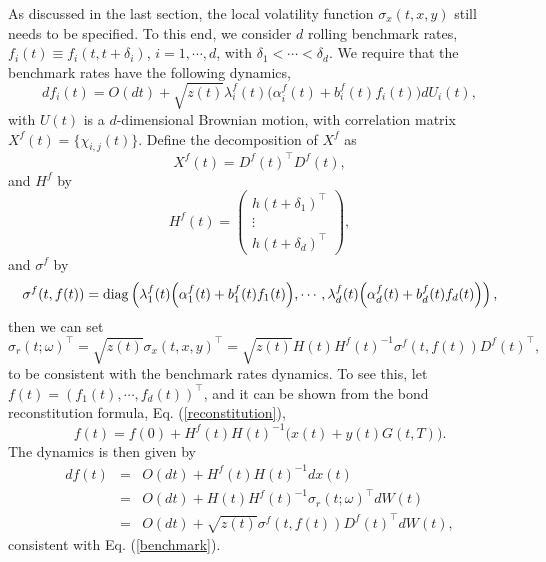 \documentclass[12pt]{article}
\begin{document}
    As discussed in the last section, the local volatility function $\sigma_x(t,x,y)$ still needs to be specified.
    To this end, we consider $d$ rolling benchmark rates, $f_i(t)\equiv f_i(t,t+\delta_i)$, $i=1,\cdots,d$, with
    $\delta_1<\cdots<\delta_d$. We require that the benchmark rates have the following dynamics,
    \begin{equation}
      df_i(t)=O(dt)+\sqrt{z(t)}\lambda_i^f(t)\Big(\alpha_i^f(t)+b_i^f(t)f_i(t)\Big)dU_i(t),
      \label{benchmark}
    \end{equation}
    with $U(t)$ is a $d$-dimensional Brownian motion, with correlation matrix $X^f(t)=\{\chi_{i,j}(t)\}$. Define the decomposition
    of $X^f$ as
    \begin{equation}
      X^f(t)=D^f(t)^{\top}D^f(t),
    \end{equation}
    and $H^f$ by
    \begin{equation}
      H^f(t)=\left(
                \begin{array}{c}
                  h(t+\delta_1)^{\top}\\
                  \vdots\\
                  h(t+\delta_d)^{\top}
                \end{array}
              \right),
    \end{equation}
    and $\sigma^f$ by
    \begin{equation}
      \sigma^f(t,f(t))={\rm diag}\left(
                \lambda_1^f(t)\Big(\alpha_1^f(t)+b_1^f(t)f_1(t)\Big),
                \cdots,
                \lambda_d^f(t)\Big(\alpha_d^f(t)+b_d^f(t)f_d(t)\Big)
              \right),
    \end{equation}
    then we can set
    \begin{equation}
      \sigma_r(t;\omega)^{\top}=\sqrt{z(t)}\sigma_x(t,x,y)^{\top}
                =\sqrt{z(t)}H(t)H^f(t)^{-1}\sigma^f(t,f(t))D^f(t)^{\top},
    \end{equation}
    to be consistent with the benchmark rates dynamics. To see this, let $f(t)=(f_1(t),\cdots,f_d(t))^{\top}$,
    and it can be shown from the bond reconstitution formula, Eq. (\ref{reconstitution}),
    \begin{equation}
      f(t)=f(0)+H^f(t)H(t)^{-1}\Big(x(t)+y(t)G(t,T)\Big).
    \end{equation}
    The dynamics is then given by
    \begin{eqnarray}
      df(t) &=& O(dt)+H^f(t)H(t)^{-1}dx(t)\nonumber\\
            &=& O(dt)+H(t)H^f(t)^{-1}\sigma_r(t;\omega)^{\top}dW(t)\nonumber\\
            &=& O(dt)+\sqrt{z(t)}\sigma^f(t,f(t))D^f(t)^{\top}dW(t),
    \end{eqnarray}
    consistent with Eq. (\ref{benchmark}).
\end{document}
